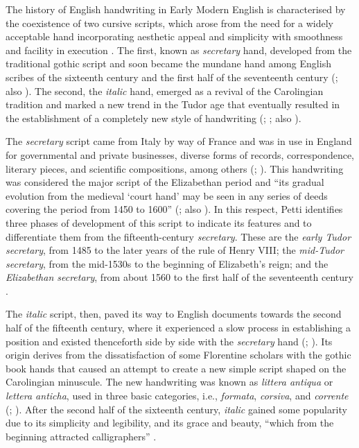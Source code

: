 \begin{paper}
The history of English handwriting in Early Modern English is
characterised by the coexistence of two cursive scripts, which arose from the need for a widely acceptable hand incorporating aesthetic
appeal and simplicity with smoothness and facility in execution \citep[16]{petti_english_1977}. The first, known as \emph{secretary} hand, developed from the
traditional gothic script and soon became the mundane hand among English
scribes of the sixteenth century and the first half of the seventeenth
century (\cite[8]{dawson_elizabethan_1966}; also \cite[16]{petti_english_1977}). The
second, the \emph{italic} hand, emerged as a revival of the
Carolingian tradition and marked a new trend in the Tudor age that
eventually resulted in the establishment of a completely new style of
handwriting (\cite[20]{fairbank_renaissance_1960}; \cite[viii]{preston_english_1999}; also \cite[18]{petti_english_1977}).

The \emph{secretary} script came from Italy by way of
France and was in use in England for governmental and private
businesses, diverse forms of records, correspondence, literary pieces,
and scientific compositions, among others (\cite[8--9]{dawson_elizabethan_1966}; \cite[viii]{preston_english_1999}). This handwriting was
considered the major script of the Elizabethan period and ``its gradual
evolution from the medieval `court hand' may be seen in any series of
deeds covering the period from 1450 to 1600'' (\cite[414]{schulz_teaching_1943}; also
\cite{jenkinson_later_1927}). In this respect, Petti identifies three phases of
development of this script to indicate its features and to differentiate
them from the fifteenth-century \emph{secretary}. These are the
\emph{early Tudor secretary}, from 1485 to the later years of the rule
of Henry VIII; the \emph{mid-Tudor secretary}, from the mid-1530s to the
beginning of Elizabeth's reign; and the \emph{Elizabethan secretary},
from about 1560 to the first half of the seventeenth century \citep[16--18]{petti_english_1977}.

The \emph{italic} script, then, paved its way to English
documents towards the second half of the fifteenth century, where it
experienced a slow process in establishing a position and existed
thenceforth side by side with the \emph{secretary} hand (\cite[28]{fairbank_renaissance_1960}; \cite[viii]{preston_english_1999}). Its origin derives from
the dissatisfaction of some Florentine scholars with the gothic book
hands that caused an attempt to create a new simple script shaped on the
Carolingian minuscule. The new handwriting was known as \emph{littera
antiqua} or \emph{lettera anticha}, used in three basic categories, i.e.,
\emph{formata}, \emph{corsiva}, and \emph{corrente} (\cite[6]{morison_early_1943};
\cite[18]{petti_english_1977}). After the second half of the sixteenth century,
\emph{italic} gained some popularity due to its simplicity and
legibility, and its grace and beauty, ``which from the beginning
attracted calligraphers'' \citep[9]{dawson_elizabethan_1966}.


\end{paper}
